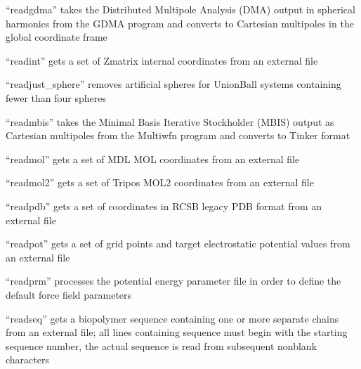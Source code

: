 \documentclass[letterpaper,11pt,english]{sphinxmanual}
\begin{document}
\sphinxAtStartPar
“readgdma” takes the Distributed Multipole Analysis (DMA) output in spherical harmonics from the GDMA program and converts to Cartesian multipoles in the global coordinate frame

\sphinxAtStartPar
{}

\sphinxAtStartPar
“readint” gets a set of Z\sphinxhyphen{}matrix internal coordinates from an external file

\sphinxAtStartPar
{}

\sphinxAtStartPar
“readjust\_sphere” removes artificial spheres for UnionBall systems containing fewer than four spheres

\sphinxAtStartPar
{}

\sphinxAtStartPar
“readmbis” takes the Minimal Basis Iterative Stockholder (MBIS) output as Cartesian multipoles from the Multiwfn program and converts to Tinker format

\sphinxAtStartPar
{}

\sphinxAtStartPar
“readmol” gets a set of MDL MOL coordinates from an external file

\sphinxAtStartPar
{}

\sphinxAtStartPar
“readmol2” gets a set of Tripos MOL2 coordinates from an external file

\sphinxAtStartPar
{}

\sphinxAtStartPar
“readpdb” gets a set of coordinates in RCSB legacy PDB format from an external file

\sphinxAtStartPar
{}

\sphinxAtStartPar
“readpot” gets a set of grid points and target electrostatic potential values from an external file

\sphinxAtStartPar
{}

\sphinxAtStartPar
“readprm” processes the potential energy parameter file in order to define the default force field parameters

\sphinxAtStartPar
{}

\sphinxAtStartPar
“readseq” gets a biopolymer sequence containing one or more separate chains from an external file; all lines containing sequence must begin with the starting sequence number, the actual sequence is read from subsequent nonblank characters
\end{document}
